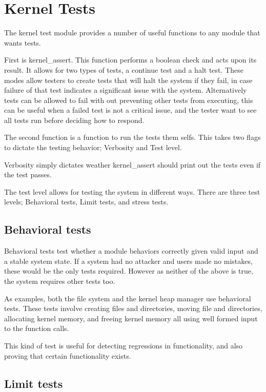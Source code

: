 \documentclass[a4paper]{report}
\begin{document}
\section{Kernel Tests}

The kernel test module provides a number of useful functions to any module that wants tests.

First is kernel\_assert. This function performs a boolean check and acts upon its result. It allows for two types of tests, a continue test and a halt test. These modes allow testers to create tests that will halt the system if they fail, in case failure of that test indicates a significant issue with the system. Alternatively tests can be allowed to fail with out preventing other tests from executing, this can be useful when a failed test is not a critical issue, and the tester want to see all tests run before deciding how to respond.

The second function is a function to run the tests them selfs. This takes two flags to dictate the testing behavior; Verbosity and Test level.

Verbosity simply dictates weather kernel\_assert should print out the tests even if the test passes.

The test level allows for testing the system in different ways. There are three test levels; Behavioral tests, Limit tests, and stress tests.

\subsection{Behavioral tests}

Behavioral tests test whether a module behaviors correctly given valid input and a stable system state. If a system had no attacker and users made no mistakes, these would be the only tests required. However as neither of the above is true, the system requires other tests too.

As examples, both the file system and the kernel heap manager use behavioral tests. These tests involve creating files and directories, moving file and directories, allocating kernel memory, and freeing kernel memory all using well formed input to the function calls.

This kind of test is useful for detecting regressions in functionality, and also proving that certain functionality exists.

\subsection{Limit tests}
\end{document}
